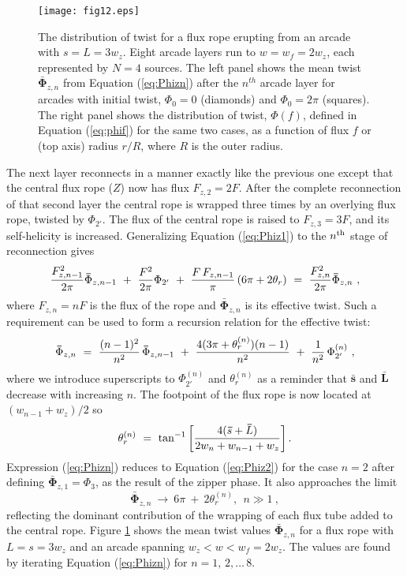 \documentclass[10pt,namedreferneces]{SolarPhysics}
\begin{document}
\begin{article}
\begin{figure}[h]
{\centering
 \texttt{[image: fig12.eps]}
\caption{The distribution of twist for a flux rope erupting from an arcade with $s=L=3w_z$.  Eight arcade layers run to $w=w_f=2w_z$, each represented by $N=4$  sources.
The left panel shows the mean twist $\bm\bar{\Phi}_{z,n}$ from Equation (\ref{eq:Phizn}) after the $n^{th}$ arcade layer for arcades with initial twist, $\Phi_0=0$ (diamonds) and $\Phi_0=2\pi$ (squares).  The right panel shows the distribution of twist, $\Phi(f)$, defined in Equation (\ref{eq:phif}) for the same two cases, as a function of flux $f$ or (top axis) radius $r/R$, where $R$ is the outer radius.}
\label{fig12}}
\end{figure}
The next layer  reconnects in a manner exactly like the previous one except that the central flux rope ($Z$) now has flux $F_{z,2}=2F$.  After the complete reconnection of  that second layer the central rope is wrapped three times by an overlying flux rope, twisted by $\Phi_{2'}$.  The flux of the  central rope is raised to $F_{z,3}=3F$, and its self-helicity is increased.    
Generalizing Equation  (\ref{eq:Phiz1}) to the $n^{\rm th}$ stage of reconnection gives
\begin{equation}
  {F_{z,n-1}^2\over2\pi}\bm\bar{\Phi}_{z,n-1} ~+~ {F^2\over 2\pi}\Phi_{2'} ~+~ 
 {F\,F_{z,n-1}\over \pi}\, (6\pi+2\theta_r)  ~=~ {F_{z,n}^2\over2\pi}\bm\bar{\Phi}_{z,n} ~,
\end{equation}
where $F_{z,n}=nF$ is the flux of the rope and $\bm\bar{\Phi}_{z,n}$ is its effective twist.   Such a requirement can be used to form a recursion relation for the effective twist:
\begin{equation}
  \bm\bar{\Phi}_{z,n} ~=~ {(n-1)^2\over n^2}\, \bm\bar{\Phi}_{z,n-1} ~+~{4(3\pi+\theta_r^{(n)})(n-1)\over n^2} ~+~ {1\over n^2}\, \Phi^{(n)}_{2'} ~ ,
  	\label{eq:Phizn}
\end{equation}
where we  introduce superscripts to $\Phi^{(n)}_{2'}$ and $\theta_r^{(n)}$ as a reminder that $\bm\bar{s}$ and $\bm\bar{L}$ decrease with increasing $n$.  The footpoint of the flux rope is now located at $(w_{n-1}+w_z)/2$ so
\begin{equation}
 \theta_r^{(n)} ~=~\tan^{-1}\left[{4(\bm\bar{s}+\bm\bar{L})\over 2w_n+w_{n-1}+w_z}\right] .
\end{equation}
Expression (\ref{eq:Phizn}) reduces to Equation  (\ref{eq:Phiz2}) for the case $n=2$ after defining $\bm\bar{\Phi}_{z,1}=\Phi_3$, as the result of the zipper phase. It also approaches the limit
\begin{equation}
  \bm\bar{\Phi}_{z,n} ~\to~ 6\pi ~+~2\theta_r^{(n)} ,~~n\gg1 ~,
  	\label{eq:Phi_lim}
\end{equation}
reflecting the dominant contribution of the wrapping of each flux tube added to the central rope.  Figure \ref{fig12} shows the mean twist values $\bm\bar{\Phi}_{z,n}$ for a flux rope with $L=s=3w_z$ and an arcade spanning $w_z<w<w_f=2w_z$.  The values are found by iterating Equation  (\ref{eq:Phizn}) for $n=1,\,2,\dots\, 8$.


\end{article}
\end{document}
